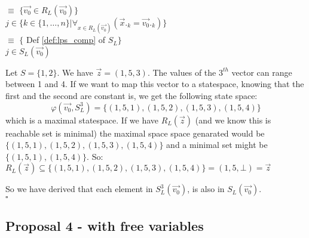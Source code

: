 \index{}\documentclass[a4paper,10pt]{article}
\theoremstyle{plain}
\theoremstyle{definition}
\newcommand{\ovr}{\overrightarrow}
\newcommand{\sq}{$\square$}
\begin{document}
\begin{itemize}
\tmp $ \equiv$ \hspace{20pt} $\lbrace \ovr{v_0}  \in R_L(\ovr{v_0}) \rbrace$\\
\tmp $ j \in \lbrace k \in \lbrace 1, \ldots, n \rbrace \vert \forall_{x \in R_L(\ovr{v_0})}(\ovr{x}._k = \ovr{v_0}._k) \rbrace$\\
\tmp $ \equiv$ \hspace{20pt} $\lbrace$ Def \ref{def:lps_comp} of $S_L\rbrace$\\
\tmp $ j \in S_L(\ovr{v_0})$

\begin{example}\label{example:proof3}
Let $S = \lbrace 1, 2 \rbrace$.
We have $\ovr{z} = (1, 5, 3)$. 
The values of the $3^{th}$ vector can range between 1 and 4.
If we want to map this vector to a statespace, knowing that the first and the second are
constant is, we get the following state space: 
$$  \varphi(\ovr{v_0},S_L^3) = \lbrace (1, 5, 1), (1, 5, 2), (1, 5, 3), (1, 5, 4) \rbrace$$
which is a maximal statespace. 
If we have $R_L(\ovr{z})$ (and we know this is reachable set is minimal) the maximal space space genarated would be 
$\lbrace (1, 5, 1), (1, 5, 2), (1, 5, 3), (1, 5, 4) \rbrace$ and a minimal set might be $\lbrace (1, 5, 1), (1, 5, 4) \rbrace$. 
So:
$R_L(\ovr{z}) \subseteq \lbrace (1, 5, 1), (1, 5, 2), (1, 5, 3), (1, 5, 4) \rbrace =  (1, 5, \bot) = \ovr{z} $\\
\end{example}

\end{itemize}
So we have derived that each element in $S_L^3(\ovr{v_0})$, is also in $S_L(\ovr{v_0})$.
\\ \sq


\newpage
\subsection{Proposal 4 - with free variables}
\end{document}
